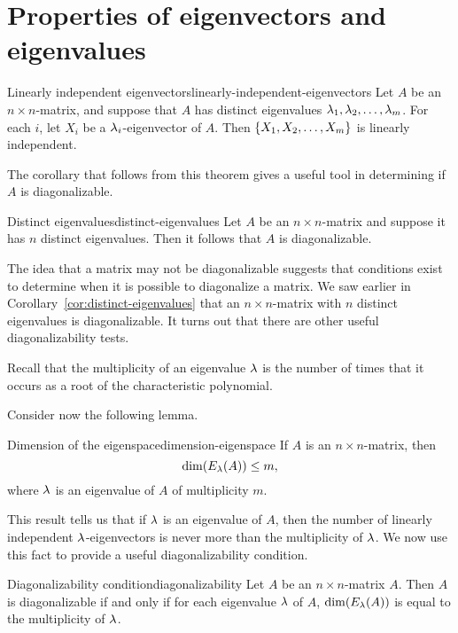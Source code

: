 \section{Properties of eigenvectors and eigenvalues}

\begin{theorem}{Linearly independent eigenvectors}{linearly-independent-eigenvectors}
  Let $A$ be an $n\times n$-matrix, and suppose that $A$ has distinct
  eigenvalues $\lambda_1, \lambda_2, \ldots, \lambda_m$.  For each
  $i$, let $X_i$ be a $\lambda_i$-eigenvector of $A$.  Then
  $\left\{X_1, X_2, \ldots, X_m\right\}$ is linearly independent.
\end{theorem}

The corollary that follows from this theorem gives a useful tool in
determining if $A$ is diagonalizable.

\begin{corollary}{Distinct eigenvalues}{distinct-eigenvalues}
  Let $A$ be an $n \times n$-matrix and suppose it has $n$ distinct
  eigenvalues. Then it follows that $A$ is diagonalizable.
\end{corollary}

The idea that a matrix may not be diagonalizable suggests that
conditions exist to determine when it is possible to diagonalize a
matrix. We saw earlier in Corollary~\ref{cor:distinct-eigenvalues}
that an $n \times n$-matrix with $n$ distinct eigenvalues is
diagonalizable. It turns out that there are other useful
diagonalizability tests.

Recall that the multiplicity of an eigenvalue $\lambda$ is the number
of times that it occurs as a root of the characteristic polynomial.

Consider now the following lemma.

\begin{lemma}{Dimension of the eigenspace}{dimension-eigenspace}
  If $A$ is an $n\times n$-matrix, then
  \begin{equation*}
    \dim(E_{\lambda}(A))\leq m,
  \end{equation*}
  where $\lambda$ is an eigenvalue of $A$ of multiplicity $m$.
\end{lemma}

This result tells us that if $\lambda$ is an eigenvalue of $A$, then
the number of linearly independent $\lambda$-eigenvectors is never
more than the multiplicity of $\lambda$. We now use this fact to
provide a useful diagonalizability condition.

\begin{theorem}{Diagonalizability condition}{diagonalizability}
  Let $A$ be an $n \times n$-matrix $A$. Then $A$ is diagonalizable if
  and only if for each eigenvalue $\lambda$ of $A$,
  $\dim(E_{\lambda}(A))$ is equal to the multiplicity of $\lambda$.
\end{theorem}
